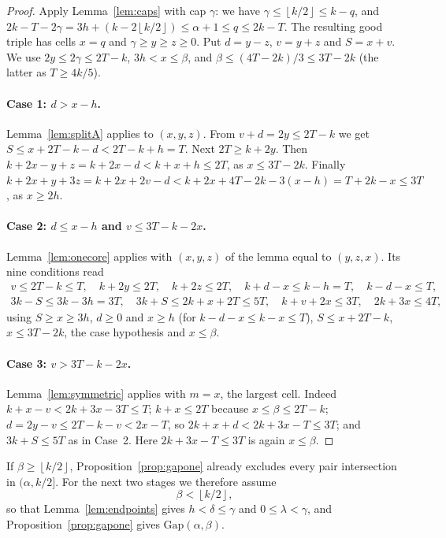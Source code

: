 \documentclass[11pt]{article}
\numberwithin{equation}{section}
\theoremstyle{definition}
\theoremstyle{remark}
\newcommand{\floor}[1]{\left\lfloor #1\right\rfloor}
\newcommand{\Gap}{\mathrm{Gap}}
\begin{document}
\begin{proof}
Apply Lemma~\ref{lem:caps} with cap $\gamma$: we have
$\gamma\le\floor{k/2}\le k-q$, and
$2k-T-2\gamma=3h+(k-2\floor{k/2})\le\alpha+1\le q\le2k-T$. The resulting
good triple has cells $x=q$ and $\gamma\ge y\ge z\ge0$. Put $d=y-z$,
$v=y+z$ and $S=x+v$. We use $2y\le2\gamma\le2T-k$, $3h<x\le\beta$, and
$\beta\le(4T-2k)/3\le3T-2k$ (the latter as $T\ge4k/5$).

\paragraph{Case 1: $d>x-h$.} Lemma~\ref{lem:splitA} applies to $(x,y,z)$.
From $v+d=2y\le2T-k$ we get $S\le x+2T-k-d<2T-k+h=T$. Next $2T\ge k+2y$.
Then $k+2x-y+z=k+2x-d<k+x+h\le2T$, as $x\le3T-2k$. Finally
$k+2x+y+3z=k+2x+2v-d<k+2x+4T-2k-3(x-h)=T+2k-x\le3T$, as $x\ge2h$.

\paragraph{Case 2: $d\le x-h$ and $v\le3T-k-2x$.} Lemma~\ref{lem:onecore}
applies with $(x,y,z)$ of the lemma equal to $(y,z,x)$. Its nine
conditions read
\begin{gather*}
 v\le2T-k\le T,\quad k+2y\le2T,\quad k+2z\le2T,\quad
 k+d-x\le k-h=T,\quad k-d-x\le T,\\
 3k-S\le3k-3h=3T,\quad 3k+S\le2k+x+2T\le5T,\quad k+v+2x\le3T,\quad
 2k+3x\le4T,
\end{gather*}
using $S\ge x\ge3h$, $d\ge0$ and $x\ge h$ (for $k-d-x\le k-x\le T$), $S\le x+2T-k$,
$x\le3T-2k$, the case hypothesis and $x\le\beta$.

\paragraph{Case 3: $v>3T-k-2x$.} Lemma~\ref{lem:symmetric} applies with
$m=x$, the largest cell. Indeed $k+x-v<2k+3x-3T\le T$; $k+x\le2T$ because
$x\le\beta\le2T-k$; $d=2y-v\le2T-k-v<2x-T$, so $2k+x+d<2k+3x-T\le3T$; and
$3k+S\le5T$ as in Case~2. Here $2k+3x-T\le3T$ is again $x\le\beta$.
\end{proof}

If $\beta\ge\floor{k/2}$, Proposition~\ref{prop:gapone} already excludes
every pair intersection in $(\alpha,k/2]$. For the next two stages we
therefore assume
\begin{equation}\label{eq:branch}
 \beta<\floor{k/2},
\end{equation}
so that Lemma~\ref{lem:endpoints} gives $h<\delta\le\gamma$ and
$0\le\lambda<\gamma$, and Proposition~\ref{prop:gapone} gives
$\Gap(\alpha,\beta)$.
\end{document}
